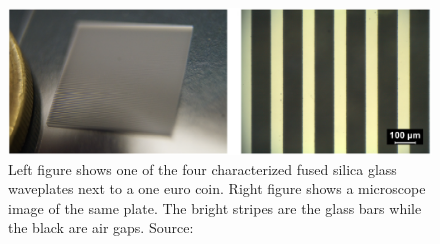 \begin{figure}
    \centering
    \includegraphics[scale=0.45]{images/4_chapter04/SLE_waveplate_JO_.png}
    \caption{Left figure shows one of the four characterized fused silica glass waveplates next to a one euro coin. Right figure shows a microscope image of the same plate. The bright stripes are the glass bars while the black are air gaps. Source: \cite{Ornik2018}}
    \label{fig:SLE_waveplate_JO_}
\end{figure}

